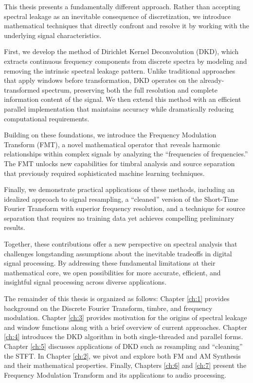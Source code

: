 \documentclass[11pt,twoside]{report}
\numberwithin{thm}{section}
\numberwithin{equation}{section}
\begin{document}
This thesis presents a fundamentally different approach. Rather than accepting spectral leakage as an inevitable consequence of discretization, we introduce mathematical techniques that directly confront and resolve it by working with the underlying signal characteristics.

First, we develop the method of Dirichlet Kernel Deconvolution (DKD), which extracts continuous frequency components from discrete spectra by modeling and removing the intrinsic spectral leakage pattern. Unlike traditional approaches that apply windows before transformation, DKD operates on the already-transformed spectrum, preserving both the full resolution and complete information content of the signal. We then extend this method with an efficient parallel implementation that maintains accuracy while dramatically reducing computational requirements.

Building on these foundations, we introduce the Frequency Modulation Transform (FMT), a novel mathematical operator that reveals harmonic relationships within complex signals by analyzing the ``frequencies of frequencies.'' The FMT unlocks new capabilities for timbral analysis and source separation that previously required sophisticated machine learning techniques.

Finally, we demonstrate practical applications of these methods, including an idealized approach to signal resampling, a ``cleaned'' version of the Short-Time Fourier Transform with superior frequency resolution, and a technique for source separation that requires no training data yet achieves compelling preliminary results.

Together, these contributions offer a new perspective on spectral analysis that challenges longstanding assumptions about the inevitable tradeoffs in digital signal processing. By addressing these fundamental limitations at their mathematical core, we open possibilities for more accurate, efficient, and insightful signal processing across diverse applications.

The remainder of this thesis is organized as follows: Chapter \ref{ch:1} provides background on the Discrete Fourier Transform, timbre, and frequency modulation. Chapter \ref{ch:3} provides motivation for the origins of spectral leakage and window functions along with a brief overview of current approaches. Chapter \ref{ch:4} introduces the DKD algorithm in both single-threaded and parallel forms. Chapter \ref{ch:5} discusses applications of DKD such as resampling and ``cleaning'' the STFT. In Chapter \ref{ch:2}, we pivot and explore both FM and AM Synthesis and their mathematical properties. Finally, Chapters \ref{ch:6} and \ref{ch:7} present the Frequency Modulation Transform and its applications to audio processing. 
\end{document}
